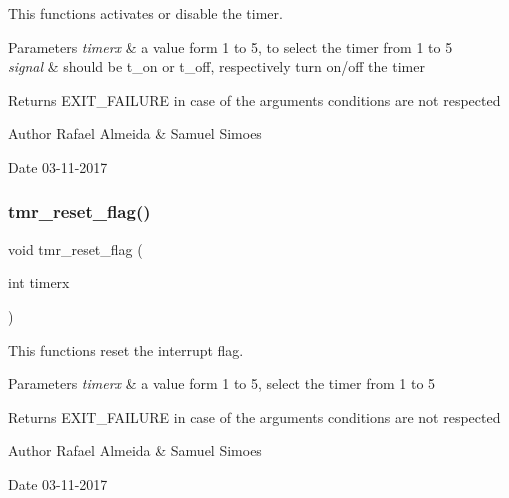 This functions activates or disable the timer. 


\begin{DoxyParams}{Parameters}
{\em timerx} & a value form 1 to 5, to select the timer from 1 to 5 \\
\hline
{\em signal} & should be t\+\_\+on or t\+\_\+off, respectively turn on/off the timer \\
\hline
\end{DoxyParams}
\begin{DoxyReturn}{Returns}
E\+X\+I\+T\+\_\+\+F\+A\+I\+L\+U\+RE in case of the argument\textquotesingle{}s conditions are not respected 
\end{DoxyReturn}
\begin{DoxyAuthor}{Author}
Rafael Almeida \& Samuel Simoes 
\end{DoxyAuthor}
\begin{DoxyDate}{Date}
03-\/11-\/2017 
\end{DoxyDate}
\mbox{\label{_timer__libs_8c_aba8fbc7ba2284c6aa129f79864535e69}} 
\subsubsection{tmr\+\_\+reset\+\_\+flag()}
{\footnotesize\ttfamily void tmr\+\_\+reset\+\_\+flag (\begin{DoxyParamCaption}\item[{int}]{timerx }\end{DoxyParamCaption})}



This functions reset the interrupt flag. 


\begin{DoxyParams}{Parameters}
{\em timerx} & a value form 1 to 5, select the timer from 1 to 5 \\
\hline
\end{DoxyParams}
\begin{DoxyReturn}{Returns}
E\+X\+I\+T\+\_\+\+F\+A\+I\+L\+U\+RE in case of the argument\textquotesingle{}s conditions are not respected 
\end{DoxyReturn}
\begin{DoxyAuthor}{Author}
Rafael Almeida \& Samuel Simoes 
\end{DoxyAuthor}
\begin{DoxyDate}{Date}
03-\/11-\/2017 
\end{DoxyDate}
\mbox{\label{_timer__libs_8c_a303cd7354e05d6a9cb43021b28a37fc5}} 
